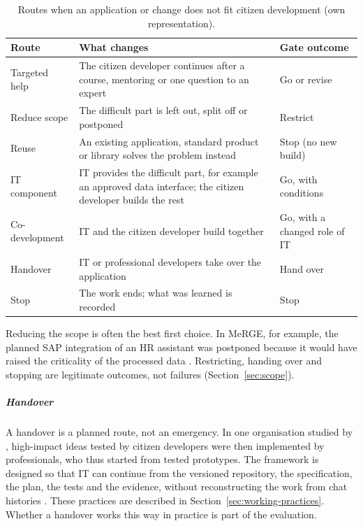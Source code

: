 \documentclass[10pt,a4paper]{article}
\begin{document}
\begin{table}[H]
    \centering
    \small
    \caption{Routes when an application or change does not fit citizen
    development (own representation).}
    \label{tab:scope-routes}
    \begin{tabular}{@{}p{3.4cm} p{6.6cm} p{3.4cm}@{}}
    \toprule
    \textbf{Route} & \textbf{What changes} & \textbf{Gate outcome} \\
    \midrule
    Targeted help & The citizen developer continues after a course,
        mentoring or one question to an expert & Go or revise \\
    \addlinespace
    Reduce scope & The difficult part is left out, split off or
        postponed & Restrict \\
    \addlinespace
    Reuse & An existing application, standard product or library
        solves the problem instead & Stop (no new build) \\
    \addlinespace
    IT component & IT provides the difficult part, for example an
        approved data interface; the citizen developer builds the rest
        & Go, with conditions \\
    \addlinespace
    Co-development & IT and the citizen developer build together & Go,
        with a changed role of IT \\
    \addlinespace
    Handover & IT or professional developers take over the
        application & Hand over \\
    \addlinespace
    Stop & The work ends; what was learned is recorded & Stop \\
    \bottomrule
    \end{tabular}
\end{table}

Reducing the scope is often the best first choice. In MeRGE, for
example, the planned SAP integration of an HR assistant was postponed
because it would have raised the criticality of the processed data
\parencite{fetzer2026}. Restricting, handing over and stopping are
legitimate outcomes, not failures (Section~\ref{sec:scope}).

\subparagraph{Handover}

A handover is a planned route, not an emergency. In one organisation
studied by \textcite{binzer2024}, high-impact ideas tested by citizen
developers were then implemented by professionals, who thus started
from tested prototypes. The framework is designed so that IT can
continue from the versioned repository, the specification, the plan,
the tests and the evidence, without reconstructing the work from chat
histories \parencite{friel2025,diaz2026}. These practices are
described in Section~\ref{sec:working-practices}. Whether a handover
works this way in practice is part of the evaluation.
\end{document}
